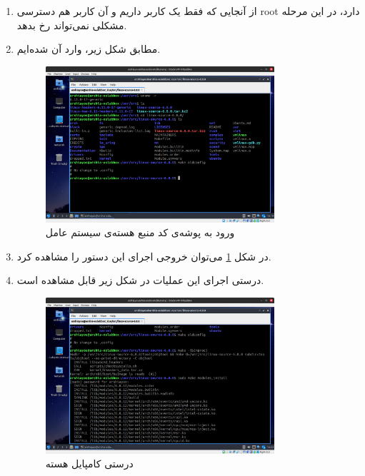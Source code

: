 \documentclass[12pt]{article}
\begin{document}
        \begin{enumerate}
        \item 
        از آنجایی که فقط یک کاربر داریم و آن کاربر هم دسترسی 
        \textenglish{root}
        دارد، در این مرحله مشکلی نمی‌تواند رخ بدهد.

        \item 
        مطابق شکل زیر، وارد آن شده‌ایم.

        \begin{figure}[H]
		\centering
		\includegraphics[width=0.8\textwidth]{report2-resources/15.png}
		\caption{ورود به پوشه‌ی کد منبع هسته‌ی سیستم عامل}
            \label{im15}
	\end{figure}

        \item 
        در شکل
        \ref{im15}
        می‌توان خروجی اجرای این دستور را مشاهده کرد.

        \item 
        درستی اجرای این عملیات در شکل زیر قابل مشاهده است.

        \begin{figure}[H]
		\centering
		\includegraphics[width=0.8\textwidth]{report2-resources/17.png}
		\caption{درستی کامپایل هسته}
	\end{figure}


\end{enumerate}
\end{document}
